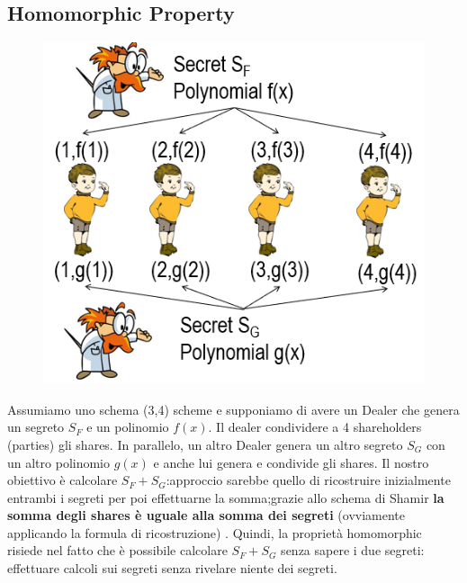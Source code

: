 \documentclass{book}
\begin{document}
\subsection{Homomorphic Property}
\setlength\intextsep{0pt}
\begin{figure}
    \centering
    \includegraphics[scale=0.5]{2021-12-29-21-48-24.png}%
\end{figure}
Assumiamo uno schema (3,4) scheme e supponiamo di avere un Dealer che genera un segreto \(S_{F}\) e un polinomio \(f(x)\).
Il dealer condividere a 4 shareholders (parties) gli shares.
In parallelo, un altro Dealer genera un altro segreto \(S_{G}\) con un altro polinomio \(g(x)\) e anche lui genera e condivide gli shares\@.\newline
Il nostro obiettivo è calcolare \(S_{F}+S_{G}\):\@ approccio sarebbe quello di ricostruire inizialmente entrambi i segreti per poi effettuarne la somma;\@tuttavia grazie allo schema di Shamir \textbf{la somma degli shares è uguale alla somma dei segreti} (ovviamente applicando la formula di ricostruzione) \@.
Quindi, la proprietà homomorphic risiede nel fatto che è possibile calcolare \(S_{F}+S_{G}\) senza sapere i due segreti: effettuare calcoli sui segreti senza rivelare niente dei segreti\@.
\end{document}
